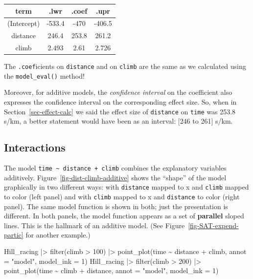 \documentclass[
  letterpaper,
  DIV=11,
  numbers=noendperiod,
  oneside]{scrartcl}
\newenvironment{Shaded}{\begin{snugshade}}{\end{snugshade}}
\newcommand{\AttributeTok}[1]{\textcolor[rgb]{0.40,0.45,0.13}{#1}}
\newcommand{\DecValTok}[1]{\textcolor[rgb]{0.68,0.00,0.00}{#1}}
\newcommand{\FunctionTok}[1]{\textcolor[rgb]{0.28,0.35,0.67}{#1}}
\newcommand{\NormalTok}[1]{\textcolor[rgb]{0.00,0.23,0.31}{#1}}
\newcommand{\SpecialCharTok}[1]{\textcolor[rgb]{0.37,0.37,0.37}{#1}}
\newcommand{\StringTok}[1]{\textcolor[rgb]{0.13,0.47,0.30}{#1}}
\begin{document}
\begin{longtable}[]{@{}cccc@{}}
\toprule\noalign{}
term & .lwr & .coef & .upr \\
\midrule\noalign{}
\endhead
\bottomrule\noalign{}
\endlastfoot
(Intercept) & -533.4 & -470 & -406.5 \\
distance & 246.4 & 253.8 & 261.2 \\
climb & 2.493 & 2.61 & 2.726 \\
\end{longtable}

The \texttt{.coef}icients on \texttt{distance} and on \texttt{climb} are
the same as we calculated using the \texttt{model\_eval()} method!

Moreover, for additive models, the \emph{confidence interval} on the
coefficient also expresses the confidence interval on the corresponding
effect size. So, when in Section~\ref{sec-effect-calc} we said the
effect size of \texttt{distance} on \texttt{time} was 253.8 s/km, a
better statement would have been as an interval: {[}246 to 261{]} s/km.

\subsection{Interactions}\label{sec-interactions}

The model \texttt{time\ \textasciitilde{}\ distance\ +\ climb} combines
the explanatory variables additively.
Figure~\ref{fig-dist-climb-additive} shows the ``shape'' of the model
graphically in two different ways: with \texttt{distance} mapped to x
and \texttt{climb} mapped to color (left panel) and with \texttt{climb}
mapped to x and \texttt{distance} to color (right panel). The same model
function is shown in both; just the presentation is different. In both
panels, the model function appears as a set of \textbf{parallel} sloped
lines. This is the hallmark of an additive model. (See
Figure~\ref{fig-SAT-expend-partic} for another example.)

\begin{Shaded}
\begin{Highlighting}[]
\NormalTok{Hill\_racing }\SpecialCharTok{|\textgreater{}} \FunctionTok{filter}\NormalTok{(climb }\SpecialCharTok{\textgreater{}} \DecValTok{100}\NormalTok{) }\SpecialCharTok{|\textgreater{}}
  \FunctionTok{point\_plot}\NormalTok{(time }\SpecialCharTok{\textasciitilde{}}\NormalTok{ distance }\SpecialCharTok{+}\NormalTok{ climb, }\AttributeTok{annot =} \StringTok{"model"}\NormalTok{,}
             \AttributeTok{model\_ink =} \DecValTok{1}\NormalTok{)}
\NormalTok{Hill\_racing }\SpecialCharTok{|\textgreater{}} \FunctionTok{filter}\NormalTok{(climb }\SpecialCharTok{\textgreater{}} \DecValTok{200}\NormalTok{) }\SpecialCharTok{|\textgreater{}}
  \FunctionTok{point\_plot}\NormalTok{(time }\SpecialCharTok{\textasciitilde{}}\NormalTok{ climb }\SpecialCharTok{+}\NormalTok{ distance, }\AttributeTok{annot =} \StringTok{"model"}\NormalTok{,}
             \AttributeTok{model\_ink =} \DecValTok{1}\NormalTok{)}
\end{Highlighting}
\end{Shaded}
\end{document}
